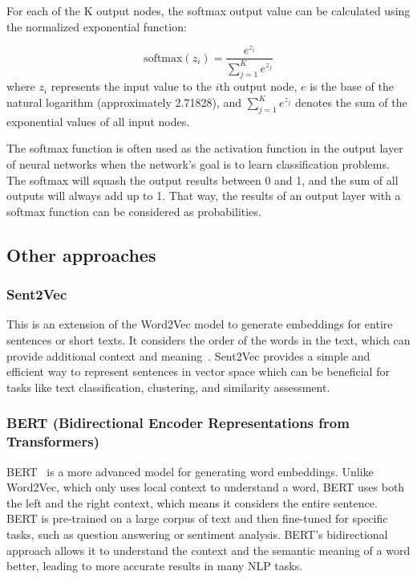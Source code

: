 \documentclass{article}
\begin{document}
For each of the K output nodes, the softmax output value can be calculated using the normalized exponential function:

\[
\text{{softmax}}(z_i) = \frac{{e^{z_i}}}{{\sum_{j=1}^{K} e^{z_j}}}
\]
where \( z_i \) represents the input value to the \( i \)th output node, \( e \) is the base of the natural logarithm (approximately 2.71828), and \( \sum_{j=1}^{K} e^{z_j} \) denotes the sum of the exponential values of all input nodes.

The softmax function is often used as the activation function in the output layer of neural networks when the network’s goal is to learn classification problems. The softmax will squash the output results between 0 and 1, and the sum of all outputs will always add up to 1. That way, the results of an output layer with a softmax function can be considered as probabilities.


\subsection{Other approaches}

\subsubsection{Sent2Vec} This is an extension of the Word2Vec model to 
generate embeddings for entire sentences or short texts. It considers 
the order of the words in the text, which can provide additional 
context and meaning~\cite{MZ20}. Sent2Vec provides a simple and efficient way to 
represent sentences in vector space which can be beneficial for tasks 
like text classification, clustering, and similarity assessment.

\subsubsection{BERT (Bidirectional Encoder Representations from 
Transformers)} 
BERT~\cite{DCLT19} is a more advanced model for generating word 
embeddings. Unlike Word2Vec, which only uses local context to 
understand a word, BERT uses both the left and the right context, 
which means it considers the entire sentence. BERT is pre-trained on 
a large corpus of text and then fine-tuned for specific tasks, such 
as question answering or sentiment analysis. BERT's bidirectional 
approach allows it to understand the context and the semantic meaning 
of a word better, leading to more accurate results in many NLP tasks.
\end{document}
